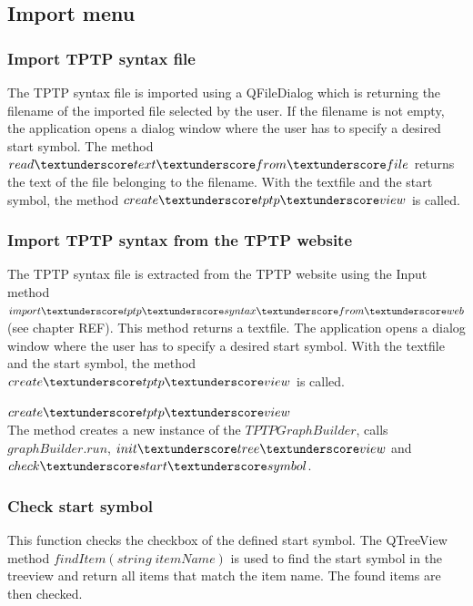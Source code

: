 \subsection{Import menu}\label{sec:ImplementationGUIImportMenu}	
\subsubsection{Import \ac{TPTP} syntax file}\label{sec:ImplementationGUIImportFile}

The \ac{TPTP} syntax file is imported using a QFileDialog which is returning the filename of the imported file selected by the user. If the filename is not empty, the application opens a dialog window where the user has to specify a desired start symbol. The method $read\textunderscore text\textunderscore from\textunderscore file$ returns the text of the file belonging to the filename. With the textfile and the start symbol, the method $create\textunderscore tptp\textunderscore view$ is called.

\subsubsection{Import \ac{TPTP} syntax from the \ac{TPTP} website}\label{sec:ImplementationGUIImportInternet}

The \ac{TPTP} syntax file is extracted from the \ac{TPTP} website using the Input method $import\textunderscore tptp\textunderscore syntax\textunderscore from\textunderscore web$ (see chapter REF). This method returns a textfile. The application opens a dialog window where the user has to specify a desired start symbol. With the textfile and the start symbol, the method $create\textunderscore tptp\textunderscore view$ is called.

$create\textunderscore tptp\textunderscore view$ \\
The method creates a new instance of the $TPTPGraphBuilder$, calls $graphBuilder.run$, $init\textunderscore tree\textunderscore view$ and $check\textunderscore start\textunderscore symbol$.

\subsubsection{Check start symbol}\label{sec:ImplementationGUIStartsymbol}

This function checks the checkbox of the defined start symbol. The QTreeView method $findItem(string\; itemName)$ is used to find the start symbol in the treeview and return all items that match the item name. 
The found items are then checked.

